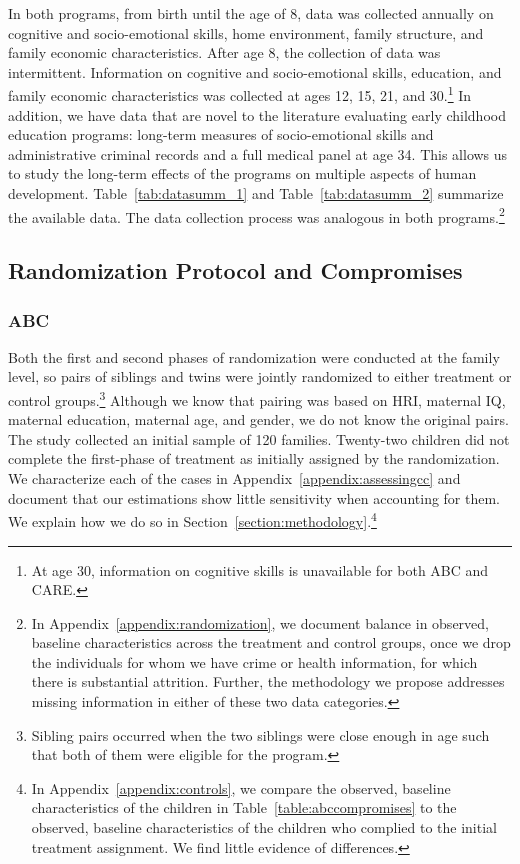 \noindent In both programs, from birth until the age of 8, data was collected annually on cognitive and socio-emotional skills, home environment, family structure, and family economic characteristics. After age 8, the collection of data was intermittent. Information on cognitive and socio-emotional skills, education, and family economic characteristics was collected at ages 12, 15, 21, and 30.\footnote{At age 30, information on cognitive skills is unavailable for both ABC and CARE.} In addition, we have data that are novel to the literature evaluating early childhood education programs: long-term measures of socio-emotional skills and administrative criminal records and a full medical panel at age 34. This allows us to study the long-term effects of the programs on multiple aspects of human development. Table~\ref{tab:datasumm_1} and Table~\ref{tab:datasumm_2} summarize the available data. The data collection process was analogous in both programs.\footnote{In Appendix~\ref{appendix:randomization}, we document balance in observed, baseline characteristics across the treatment and control groups, once we drop the individuals for whom we have crime or health information, for which there is substantial attrition. Further, the methodology we propose addresses missing information in either of these two data categories.}



\subsection{Randomization Protocol and Compromises} \label{section:randomization}

\subsubsection{ABC}

\noindent Both the first and second phases of randomization were conducted at the family level, so pairs of siblings and twins were jointly randomized to either treatment or control groups.\footnote{Sibling pairs occurred when the two siblings were close enough in age such that both of them were eligible for the program.} Although we know that pairing was based on HRI, maternal IQ, maternal education, maternal age, and gender, we do not know the original pairs. The study collected an initial sample of 120 families. Twenty-two children did not complete the first-phase of treatment as initially assigned by the randomization. We characterize each of the cases in Appendix~\ref{appendix:assessingcc} and document that our estimations show little sensitivity when accounting for them. We explain how we do so in Section~\ref{section:methodology}.\footnote{In Appendix~\ref{appendix:controls}, we compare the observed, baseline characteristics of the children in Table~\ref{table:abccompromises} to the observed, baseline characteristics of the children who complied to the initial treatment assignment. We find little evidence of differences.}\\


